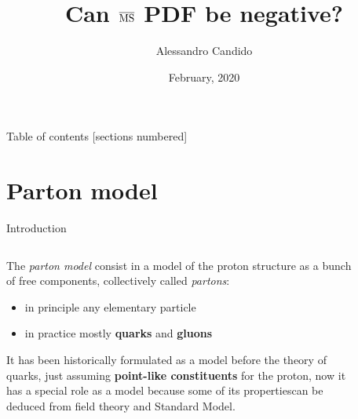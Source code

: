 \documentclass[9pt]{beamer}
\title{Can $\operatorname{\overline{MS}}$ PDF be negative?}
\date{February, 2020}
\author{Alessandro Candido
}
\begin{document}
\maketitle

\begin{frame}{Table of contents}
  [sections numbered]
    \tableofcontents%
\end{frame}

\section{Parton model}
\begin{frame}{Introduction}
    \begin{columns}
        \begin{column}{0.7\textwidth}
            The \textit{parton model} consist in a model of the proton
            structure as a bunch of free components, collectively called
            \textit{partons}:

            \begin{itemize}
                \item in principle any elementary particle
                \item in practice mostly \textbf{quarks} and \textbf{gluons}
            \end{itemize}

            \vspace*{15pt}
            It has been historically formulated as a model before the theory of
            quarks, just assuming \textbf{point-like constituents} for the
            proton, now it has a special role as a model because some of its
            properties\footnotemark can be deduced from field theory and
            Standard Model.
        \end{column}
        \begin{column}{0.3\textwidth}
            \begin{figure}
                \centering
                \includegraphics[height=150pt]{pictures/partons}
            \end{figure}
        \end{column}
    \end{columns}

\end{frame}
\end{document}
